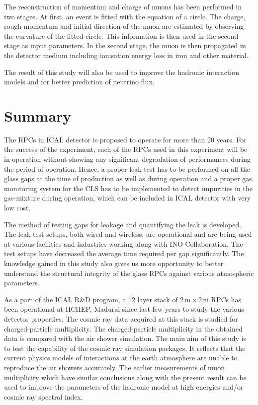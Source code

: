 \documentclass[a4paper,12pt,twoside,openany]{article}
\begin{document}
The reconstruction of momentum and charge of muons has been performed in two stages. At first, an event is fitted with the equation of a circle. The charge, rough momentum and initial direction of the muon are estimated by observing the curvature of the fitted circle. This information is then used in the second stage as input parameters. In the second stage, the muon is then propagated in the detector medium including ionisation energy loss in iron and other material.

The result of this study will also be used to improve the hadronic interaction models and for better prediction of neutrino flux.

\section{Summary}
The RPCs in ICAL detector is proposed to operate for more than 20 years. For the success of the experiment, each of the RPCs used in this experiment will be in operation without showing any significant degradation of performances during the period of operation. Hence, a proper leak test has to be performed on all the glass gaps at the time of production as well as during operation and a proper gas monitoring system for the CLS has to be implemented to detect impurities in the gas-mixture during operation, which can be included in ICAL detector with very low cost.

The method of testing gaps for leakage and quantifying the leak is developed. The leak-test setups, both wired and wireless, are operational and are being used at various facilities and industries working along with INO-Collaboration. The test setups have decreased the average time required per gap significantly. The knowledge gained in this study also gives us more opportunity to better understand the structural integrity of the glass RPCs against various atmospheric parameters.

As a part of the ICAL R\&D program, a 12 layer stack of 2\,m\,$\times$\,2\,m RPCs has been operational at IICHEP, Madurai since last few years to study the various detector properties. The cosmic ray data acquired at this stack is studied for charged-particle multiplicity. The charged-particle multiplicity in the obtained data is compared with the air shower simulation. The main aim of this study is to test the capability of the cosmic ray simulation packages. It reflects that the current physics models of interactions at the earth atmosphere are unable to reproduce the air showers accurately. The earlier measurements of muon multiplicity which have similar conclusions along with the present result can be used to improve the parameters of the hadronic model at high energies and/or cosmic ray spectral index.
\end{document}
